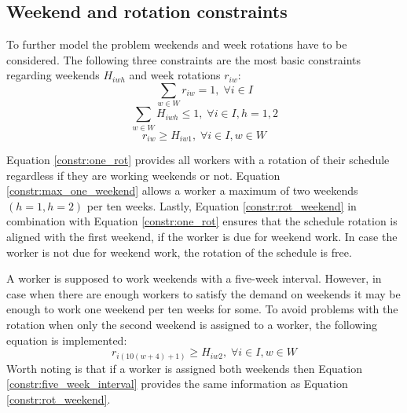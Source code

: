 \subsection{Weekend and rotation constraints} \label{section:weekend_rot_constraints}
To further model the problem weekends and week rotations have to be considered. The following three constraints are the most basic constraints regarding weekends $H_{iwh}$ and week rotations $r_{iw}$:
\begin{equation} \label{constr:one_rot}
\sum_{w \in W} r_{iw} = 1, \; \forall i\in I
\end{equation}
\begin{equation} \label{constr:max_one_weekend}
\sum_{w \in W} H_{iwh} \leq 1, \; \forall i\in I, h = 1,2
\end{equation}
\begin{equation} \label{constr:rot_weekend}
r_{iw} \geq H_{iw1}, \; \forall i\in I, w \in W
\end{equation}

Equation \ref{constr:one_rot} provides all workers with a rotation of their schedule regardless if they are working weekends or not. Equation \ref{constr:max_one_weekend} allows a worker a maximum of two weekends $(h = 1, h = 2)$ per ten weeks. Lastly, Equation \ref{constr:rot_weekend} in combination with Equation \ref{constr:one_rot} ensures that the schedule rotation is aligned with the first weekend, if the worker is due for weekend work. In case the worker is not due for weekend work, the rotation of the schedule is free.

A worker is supposed to work weekends with a five-week interval. However, in case when there are enough workers to satisfy the demand on weekends it may be enough to work one weekend per ten weeks for some. To avoid problems with the rotation when only the second weekend is assigned to a worker, the following equation is implemented:
\begin{equation} \label{constr:five_week_interval}
r_{i({10}(w+4)+1)} \geq H_{iw2}, \; \forall i\in I, w \in W
\end{equation}
Worth noting is that if a worker is assigned both weekends then Equation \ref{constr:five_week_interval} provides the same information as Equation \ref{constr:rot_weekend}.


